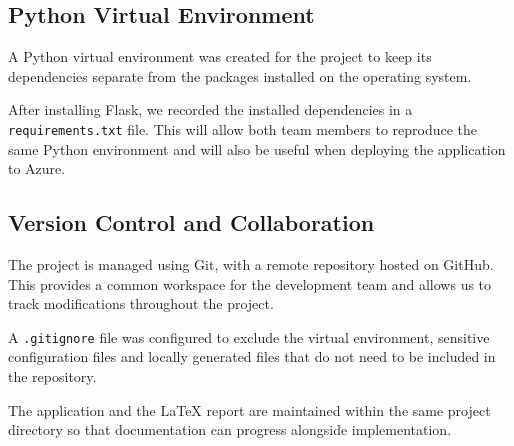 \subsection{Python Virtual Environment}

A Python virtual environment was created for the project
to keep its dependencies separate from the packages
installed on the operating system.

After installing Flask, we recorded the installed
dependencies in a \texttt{requirements.txt} file.
This will allow both team members to reproduce the
same Python environment and will also be useful
when deploying the application to Azure.

\subsection{Version Control and Collaboration}

The project is managed using Git, with a remote repository
hosted on GitHub. This provides a common workspace for
the development team and allows us to track modifications
throughout the project.

A \texttt{.gitignore} file was configured to exclude
the virtual environment, sensitive configuration files
and locally generated files that do not need to be
included in the repository.

The application and the LaTeX report are maintained
within the same project directory so that documentation
can progress alongside implementation.